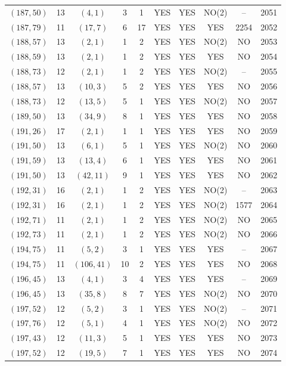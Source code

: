 \begin{longtable}{|c|c|c|c|c|c|c|c|c|c|}
$(187, 50)$ & 13 & $(4, 1)$ & 3 & 1 & YES & YES & NO(2) & -- & 2051\\
$(187, 79)$ & 11 & $(17, 7)$ & 6 & 17 & YES & YES & YES & 2254 & 2052\\
$(188, 57)$ & 13 & $(2, 1)$ & 1 & 2 & YES & YES & NO(2) & NO & 2053\\
$(188, 59)$ & 13 & $(2, 1)$ & 1 & 2 & YES & YES & YES & NO & 2054\\
$(188, 73)$ & 12 & $(2, 1)$ & 1 & 2 & YES & YES & NO(2) & -- & 2055\\
$(188, 57)$ & 13 & $(10, 3)$ & 5 & 2 & YES & YES & YES & NO & 2056\\
$(188, 73)$ & 12 & $(13, 5)$ & 5 & 1 & YES & YES & NO(2) & NO & 2057\\
$(189, 50)$ & 13 & $(34, 9)$ & 8 & 1 & YES & YES & YES & NO & 2058\\
$(191, 26)$ & 17 & $(2, 1)$ & 1 & 1 & YES & YES & YES & NO & 2059\\
$(191, 50)$ & 13 & $(6, 1)$ & 5 & 1 & YES & YES & NO(2) & NO & 2060\\
$(191, 59)$ & 13 & $(13, 4)$ & 6 & 1 & YES & YES & YES & NO & 2061\\
$(191, 50)$ & 13 & $(42, 11)$ & 9 & 1 & YES & YES & YES & NO & 2062\\
$(192, 31)$ & 16 & $(2, 1)$ & 1 & 2 & YES & YES & NO(2) & -- & 2063\\
$(192, 31)$ & 16 & $(2, 1)$ & 1 & 2 & YES & YES & NO(2) & 1577 & 2064\\
$(192, 71)$ & 11 & $(2, 1)$ & 1 & 2 & YES & YES & NO(2) & NO & 2065\\
$(192, 73)$ & 11 & $(2, 1)$ & 1 & 2 & YES & YES & NO(2) & NO & 2066\\
$(194, 75)$ & 11 & $(5, 2)$ & 3 & 1 & YES & YES & YES & -- & 2067\\
$(194, 75)$ & 11 & $(106, 41)$ & 10 & 2 & YES & YES & YES & NO & 2068\\
$(196, 45)$ & 13 & $(4, 1)$ & 3 & 4 & YES & YES & YES & -- & 2069\\
$(196, 45)$ & 13 & $(35, 8)$ & 8 & 7 & YES & YES & NO(2) & NO & 2070\\
$(197, 52)$ & 12 & $(5, 2)$ & 3 & 1 & YES & YES & NO(2) & -- & 2071\\
$(197, 76)$ & 12 & $(5, 1)$ & 4 & 1 & YES & YES & NO(2) & NO & 2072\\
$(197, 43)$ & 12 & $(11, 3)$ & 5 & 1 & YES & YES & YES & NO & 2073\\
$(197, 52)$ & 12 & $(19, 5)$ & 7 & 1 & YES & YES & YES & NO & 2074\\

\end{longtable}
